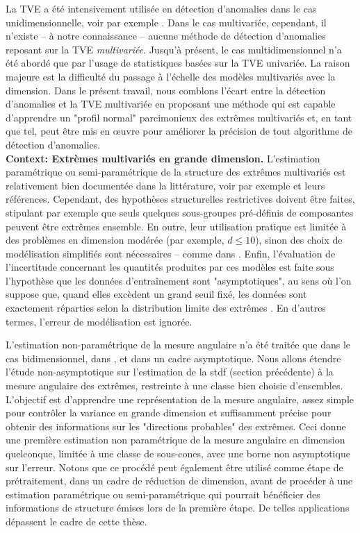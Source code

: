 \documentclass[a4paper, 12pt]{article}
\begin{document}
La TVE a été intensivement utilisée en détection d'anomalies dans le cas unidimensionnelle, voir par exemple \cite{Roberts99, Roberts2000, Clifton2011, Clifton2008, Lee2008}. Dans le cas multivariée, cependant, il n'existe -- à notre connaissance -- aucune méthode de détection d'anomalies reposant sur la TVE \textit {multivariée}. Jusqu'à présent, le cas multidimensionnel n'a été abordé que par l'usage de statistiques basées sur la TVE univariée. La raison majeure est la difficulté du passage à l'échelle des modèles multivariés avec la dimension. Dans le présent travail, nous comblons l'écart entre la détection d'anomalies et la TVE multivariée en proposant une méthode qui est capable d'apprendre un "profil normal" parcimonieux des extrêmes multivariés et, en tant que tel, peut être mis en œuvre pour améliorer la précision de tout algorithme de détection d'anomalies.\\


\textbf{Context: Extrèmes multivariés en grande dimension.}
L'estimation paramétrique ou semi-paramétrique de la structure des extrêmes multivariés est relativement bien documentée dans la littérature, voir par exemple
\cite{coles1991modeling,fougeres2009models,cooley2010pairwise,sabourinNaveau2012} 
et leurs références. Cependant, des hypothèses structurelles restrictives doivent être faites, stipulant par exemple que seuls quelques sous-groupes pré-définis de composantes peuvent être extrêmes ensemble. %
En outre, leur utilisation pratique est limitée à des problèmes en dimension modérée (par exemple, $ d \le 10 $), sinon des choix de modélisation simplifiés sont nécessaires -- comme dans \cite {stephenson2009high}. Enfin, l'évaluation de l'incertitude concernant les quantités produites par ces modèles est faite sous l'hypothèse que les données d'entraînement sont "asymptotiques", au sens où l'on suppose que, quand elles excèdent un grand seuil fixé, les données sont exactement réparties selon la distribution limite des extrêmes . En d'autres termes, l'erreur de modélisation est ignorée.


L'estimation non-paramétrique de la mesure angulaire n'a été traitée que dans le cas bidimensionnel, dans \cite{Einmahl2001, Einmahl2009}, et dans un cadre asymptotique. Nous allons étendre l'étude non-asymptotique sur l'estimation de la {\sc stdf} (section précédente) à la mesure angulaire des extrêmes, restreinte à une classe bien choisie d'ensembles. L'objectif est d'apprendre une représentation de la mesure angulaire, assez simple pour contrôler la variance en grande dimension et suffisamment précise pour obtenir des informations sur les "directions probables" des extrêmes. Ceci donne une première estimation non paramétrique de la mesure angulaire en dimension quelconque, limitée à une classe de sous-cones, avec une borne non asymptotique sur l'erreur.
Notons que ce procédé peut également être utilisé comme étape de prétraitement, dans un cadre de réduction de  dimension, avant de procéder à une estimation paramétrique ou semi-paramétrique qui pourrait bénéficier des informations de structure émises lors de la première étape. De telles applications dépassent le cadre de cette thèse.
\end{document}
